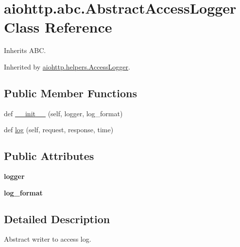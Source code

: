\hypertarget{classaiohttp_1_1abc_1_1_abstract_access_logger}{}\section{aiohttp.\+abc.\+Abstract\+Access\+Logger Class Reference}
\label{classaiohttp_1_1abc_1_1_abstract_access_logger}


Inherits A\+BC.



Inherited by \hyperlink{classaiohttp_1_1helpers_1_1_access_logger}{aiohttp.\+helpers.\+Access\+Logger}.

\subsection*{Public Member Functions}
\begin{DoxyCompactItemize}
\item 
def \hyperlink{classaiohttp_1_1abc_1_1_abstract_access_logger_aaefc25fb2d9d10109c03153f0937e860}{\+\_\+\+\_\+init\+\_\+\+\_\+} (self, logger, log\+\_\+format)
\item 
def \hyperlink{classaiohttp_1_1abc_1_1_abstract_access_logger_a0499617c36d7e00bceae17826279949f}{log} (self, request, response, time)
\end{DoxyCompactItemize}
\subsection*{Public Attributes}
\begin{DoxyCompactItemize}
\item 
\mbox{\label{classaiohttp_1_1abc_1_1_abstract_access_logger_aa6cc805a1d950b8ca9a3a73ef365ce95}} 
{\bfseries logger}
\item 
\mbox{\label{classaiohttp_1_1abc_1_1_abstract_access_logger_a4ae5e6cd4d4ffcb3cef007ed04b369f3}} 
{\bfseries log\+\_\+format}
\end{DoxyCompactItemize}


\subsection{Detailed Description}
\begin{DoxyVerb}Abstract writer to access log.\end{DoxyVerb}
 

